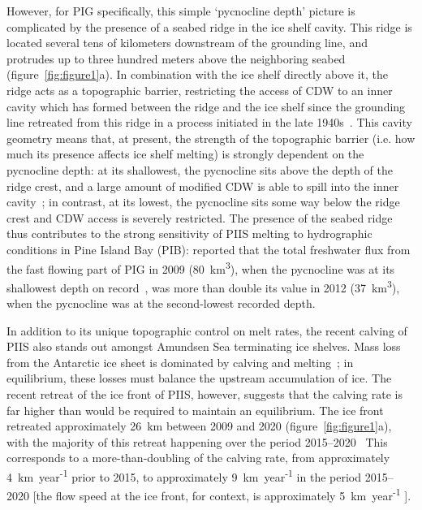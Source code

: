 \documentclass[draft]{agujournal2019}
\begin{document}
However, for PIG specifically, this simple `pycnocline depth' picture is complicated by the presence of a seabed ridge in the ice shelf cavity. This ridge is located several tens of kilometers downstream of the grounding line, and protrudes up to three hundred meters above the neighboring seabed (figure~\ref{fig:figure1}a). In combination with the ice shelf directly above it, the ridge acts as a topographic barrier, restricting the access of CDW to an inner cavity which has formed between the ridge and the ice shelf since the grounding line retreated from this ridge in a process initiated in the late 1940s~\cite{Jenkins2010NatureGeo, DeRydt2014JGeophysResOceans, DeRydt2016JGeophysResEarthSurf, Smith2017Nature}. This cavity geometry means that, at present, the strength of the topographic barrier (i.e. how much its presence affects ice shelf melting) is strongly dependent on the pycnocline depth: at its shallowest, the pycnocline sits above the depth of the ridge crest, and a large amount of modified CDW is able to spill into the inner cavity~\cite{Dutrieux2014Science}; in contrast, at its lowest, the pycnocline sits some way below the ridge crest and CDW access is severely restricted.  The presence of the seabed ridge thus contributes to the strong sensitivity of PIIS melting to hydrographic conditions in Pine Island Bay (PIB):  reported that the total freshwater flux from the fast flowing part of PIG in 2009 (80~km\textsuperscript{3}), when the pycnocline was at its shallowest depth on record~\cite{Webber2017NatureComms}, was more than double its value in 2012 (37~km\textsuperscript{3}), when the pycnocline was at the second-lowest recorded depth.

In addition to its unique topographic control on melt rates, the recent calving of PIIS also stands out amongst Amundsen Sea terminating ice shelves. Mass loss from the Antarctic ice sheet is dominated by calving and melting~\cite{Rignot2013Science}; in equilibrium, these losses must balance the upstream accumulation of ice. The recent retreat of the ice front of PIIS, however, suggests that the calving rate is far higher than would be required to maintain an equilibrium. The ice front retreated approximately 26 km between 2009 and 2020 (figure~\ref{fig:figure1}a), with the majority of this retreat happening over the period 2015--2020~\cite{Lhermitte2020PNAS, Joughin2021ScienceAdv} This corresponds to a more-than-doubling of the calving rate, from approximately 4~km~year\textsuperscript{-1} prior to 2015, to approximately 9~km~year\textsuperscript{-1} in the period 2015--2020 [the flow speed at the ice front, for context, is approximately 5~km~year\textsuperscript{-1} \cite{Joughin2021ScienceAdv}].
\end{document}
